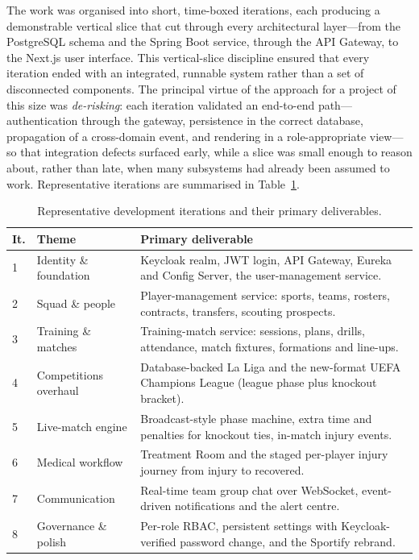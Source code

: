 The work was organised into short, time-boxed iterations, each producing a
demonstrable vertical slice that cut through every architectural layer---from the
PostgreSQL schema and the Spring Boot service, through the API Gateway, to the
Next.js user interface. This vertical-slice discipline ensured that every iteration
ended with an integrated, runnable system rather than a set of disconnected
components. The principal virtue of the approach for a project of this size was
\emph{de-risking}: each iteration validated an end-to-end path---authentication
through the gateway, persistence in the correct database, propagation of a
cross-domain event, and rendering in a role-appropriate view---so that integration
defects surfaced early, while a slice was small enough to reason about, rather than
late, when many subsystems had already been assumed to work. Representative
iterations are summarised in Table~\ref{tab:iterations}.

\begin{table}[htbp]
\centering
\caption{Representative development iterations and their primary deliverables.}
\label{tab:iterations}
\renewcommand{\arraystretch}{1.3}
\begin{tabular}{|p{}|p{}|p{}|}
\hline
\textbf{It.} & \textbf{Theme} & \textbf{Primary deliverable} \\
\hline
1 & Identity \& foundation & Keycloak realm, JWT login, API Gateway, Eureka and Config Server, the user-management service. \\
\hline
2 & Squad \& people & Player-management service: sports, teams, rosters, contracts, transfers, scouting prospects. \\
\hline
3 & Training \& matches & Training-match service: sessions, plans, drills, attendance, match fixtures, formations and line-ups. \\
\hline
4 & Competitions overhaul & Database-backed La Liga and the new-format UEFA Champions League (league phase plus knockout bracket). \\
\hline
5 & Live-match engine & Broadcast-style phase machine, extra time and penalties for knockout ties, in-match injury events. \\
\hline
6 & Medical workflow & Treatment Room and the staged per-player injury journey from injury to recovered. \\
\hline
7 & Communication & Real-time team group chat over WebSocket, event-driven notifications and the alert centre. \\
\hline
8 & Governance \& polish & Per-role RBAC, persistent settings with Keycloak-verified password change, and the Sportify rebrand. \\
\hline
\end{tabular}
\end{table}

